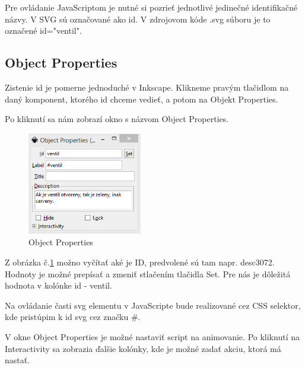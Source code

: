 Pre ovládanie JavaScriptom je nutné si pozrieť jednotlivé jedinečné identifikačné názvy. V SVG sú označované ako id. V zdrojovom kóde .svg súboru je to označené id="ventil". 

\subsection{Object Properties}
Zistenie id je pomerne jednoduché v Inkscape. Klikneme pravým tlačidlom na daný komponent, ktorého id chceme vedieť, a potom na Objekt Properties.

Po kliknutí sa nám zobrazí okno s názvom Object Properties. 

\begin{figure}[H]
	\begin{center}
		\includegraphics [width=5cm]  {obrazky/obr3.png}
		\caption{Object Properties}
		\label{picture3}
	\end{center}
\end{figure}


Z obrázka č.\ref{picture3} možno vyčítať aké je ID, predvolené sú tam napr. desc3072. Hodnoty je možné prepísať a zmeniť stlačením tlačidla Set. Pre nás je dôležitá hodnota v kolónke id - ventil. 

Na ovládanie časti svg elementu v JavaScripte bude realizované cez CSS selektor, kde pristúpim k id svg cez značku \#.   %



V okne Object Properties je možné nastaviť script na animovanie. Po kliknutí na Interactivity sa zobrazia ďalšie kolónky, kde je možné zadať akciu, ktorá má nastať.  



